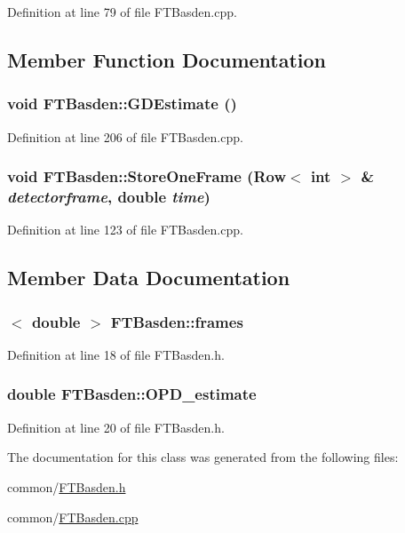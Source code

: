 Definition at line 79 of file FTBasden.cpp.



\subsection{Member Function Documentation}
\hypertarget{classFTBasden_acd78f51a4e9289f0baa700911a8d57e8}{
\subsubsection[{GDEstimate}]{\setlength{\rightskip}{0pt plus 5cm}void FTBasden::GDEstimate ()}}
\label{classFTBasden_acd78f51a4e9289f0baa700911a8d57e8}


Definition at line 206 of file FTBasden.cpp.

\hypertarget{classFTBasden_a76fe6fade8b81a074ea5e1724dbe4d6c}{
\subsubsection[{StoreOneFrame}]{\setlength{\rightskip}{0pt plus 5cm}void FTBasden::StoreOneFrame ({\bf Row}$<$ int $>$ \& {\em detectorframe}, \/  double {\em time})}}
\label{classFTBasden_a76fe6fade8b81a074ea5e1724dbe4d6c}


Definition at line 123 of file FTBasden.cpp.



\subsection{Member Data Documentation}
\hypertarget{classFTBasden_a4dcdeaee548ee6378d126b348c943f39}{
\subsubsection[{frames}]{$<$ double $>$ {\bf FTBasden::frames}}}
\label{classFTBasden_a4dcdeaee548ee6378d126b348c943f39}


Definition at line 18 of file FTBasden.h.

\hypertarget{classFTBasden_a306a1bc5d8932b9eb3ba98d670ea631b}{
\subsubsection[{OPD\_\-estimate}]{\setlength{\rightskip}{0pt plus 5cm}double {\bf FTBasden::OPD\_\-estimate}}}
\label{classFTBasden_a306a1bc5d8932b9eb3ba98d670ea631b}


Definition at line 20 of file FTBasden.h.



The documentation for this class was generated from the following files:\begin{DoxyCompactItemize}
\item 
common/\hyperlink{FTBasden_8h}{FTBasden.h}\item 
common/\hyperlink{FTBasden_8cpp}{FTBasden.cpp}\end{DoxyCompactItemize}
